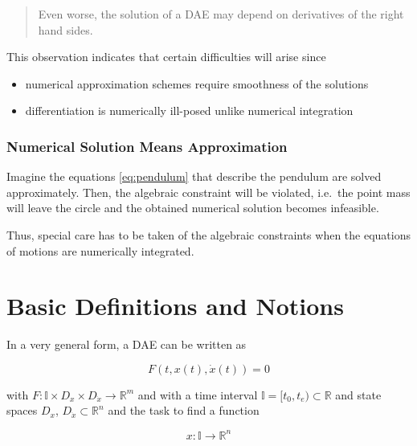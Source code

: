 \documentclass[]{book}
\providecommand{\tightlist}{%
  \setlength{\itemsep}{0pt}\setlength{\parskip}{0pt}}
\newenvironment {JHSAYS} [0] {\begin{quote}\color{jhsc}} {\end{quote}}
\theoremstyle{definition}
\theoremstyle{definition}
\theoremstyle{definition}
\theoremstyle{remark}
\begin{document}
\begin{JHSAYS}
Even worse, the solution of a DAE may depend on derivatives of the right
hand sides.
\end{JHSAYS}

This observation indicates that certain difficulties will arise since

\begin{itemize}
\tightlist
\item
  numerical approximation schemes require smoothness of the solutions
\item
  differentiation is numerically ill-posed unlike numerical integration
\end{itemize}

\hypertarget{numerical-solution-means-approximation}{%
\subsection*{Numerical Solution Means Approximation}\label{numerical-solution-means-approximation}}

Imagine the equations \eqref{eq:pendulum} that describe the pendulum are solved approximately. Then, the algebraic constraint will be violated, i.e.~the point mass will leave the circle and the obtained numerical solution becomes infeasible.

Thus, special care has to be taken of the algebraic constraints when the equations of motions are numerically integrated.

\hypertarget{basic-definitions-and-notions}{%
\chapter{Basic Definitions and Notions}\label{basic-definitions-and-notions}}

In a very general form, a DAE can be written as

\begin{equation}
    F(t, x(t), \dot x(t)) = 0
    \label{eq:gendae}
\end{equation}

with \(F\colon \mathbb I \times D_x \times D_{\dot x} \to \mathbb R^m\) and with a time interval \(\mathbb I=[t_0,t_e) \subset \mathbb R\) and state spaces \(D_x\), \(D_{\dot x} \subset \mathbb R^{n}\) and the task to find a function

\begin{equation*}
    x \colon \mathbb I \to \mathbb R^{n}
\end{equation*}
\end{document}
